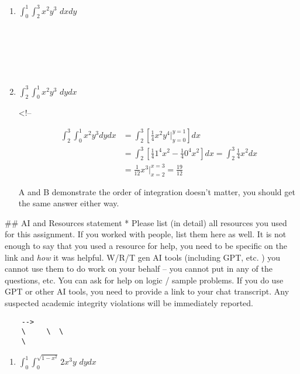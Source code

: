 \documentclass[
]{article}
\begin{document}
\begin{enumerate}
\def\labelenumi{\alph{enumi}.}
\item
  \(\int_{0}^1 \int_{2}^{3} x^2y^3 \,\, dxdy\)

  \strut \\
  \strut ~ ~ ~\\
  \strut \\
\item
  \(\int_{2}^{3} \int_{0}^1 x^2y^3 \,\, dy dx\)

  \textless!--

  \[
   \begin{aligned}
    \int_{2}^3 \int_{0}^{1} x^2y^3 dydx &= \int_2^3 [\frac{1}{4} x^2y^4 |^{y=1}_{y=0}]dx\\
    &= \int_{2}^{3} [\frac{1}{4} 1^4 x^2 - \frac{1}{4} 0^4 x^2 ] dx = \int_{2}^{3} \frac{1}{4} x^2 dx\\
    &= \frac{1}{12}x^3 |_{x=2}^{x=3} = \frac{19}{12}
   \end{aligned}
   \]

  A and B demonstrate the order of integration doesn't matter, you
  should get the same answer either way.
\end{enumerate}

\#\# AI and Resources statement * Please list (in detail) all resources
you used for this assignment. If you worked with people, list them here
as well. It is not enough to say that you used a resource for help, you
need to be specific on the link and \emph{how} it was helpful. W/R/T gen
AI tools (including GPT, etc. ) you cannot use them to do work on your
behalf -- you cannot put in any of the questions, etc. You can ask for
help on logic / sample problems. If you do use GPT or other AI tools,
you need to provide a link to your chat transcript. Any suspected
academic integrity violations will be immediately reported.

\begin{verbatim}
    -->      
    \     \  \     
    \ 
\end{verbatim}

\begin{enumerate}
\def\labelenumi{\alph{enumi}.}
\item
  \(\int_{0}^1 \int_0^{\sqrt{1-x^2}} 2x^3y \, \, dy dx\)

  \strut \\
  \strut ~ ~ ~\\
  \strut ~
\end{enumerate}
\end{document}
